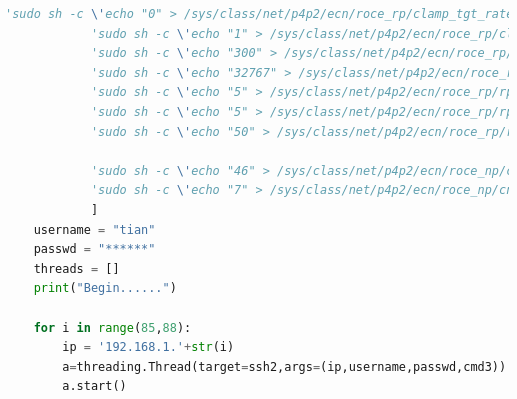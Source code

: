 \documentclass[12pt,a4paper]{article}
\begin{document}
\begin{lstlisting}[language=Python]
            'sudo sh -c \'echo "0" > /sys/class/net/p4p2/ecn/roce_rp/clamp_tgt_rate\'',
            'sudo sh -c \'echo "1" > /sys/class/net/p4p2/ecn/roce_rp/clamp_tgt_rate_after_time_inc\'',
            'sudo sh -c \'echo "300" > /sys/class/net/p4p2/ecn/roce_rp/rpg_time_reset\'',
            'sudo sh -c \'echo "32767" > /sys/class/net/p4p2/ecn/roce_rp/rpg_byte_reset\'',
            'sudo sh -c \'echo "5" > /sys/class/net/p4p2/ecn/roce_rp/rpg_threshold\'',
            'sudo sh -c \'echo "5" > /sys/class/net/p4p2/ecn/roce_rp/rpg_ai_rate\'',
            'sudo sh -c \'echo "50" > /sys/class/net/p4p2/ecn/roce_rp/rpg_hai_rate\'',

            'sudo sh -c \'echo "46" > /sys/class/net/p4p2/ecn/roce_np/cnp_dscp\'',
            'sudo sh -c \'echo "7" > /sys/class/net/p4p2/ecn/roce_np/cnp_802p_prio\'',
            ]
    username = "tian"
    passwd = "******"
    threads = []
    print("Begin......")

    for i in range(85,88):
        ip = '192.168.1.'+str(i)
        a=threading.Thread(target=ssh2,args=(ip,username,passwd,cmd3))
        a.start()

\end{lstlisting}
\end{document}

